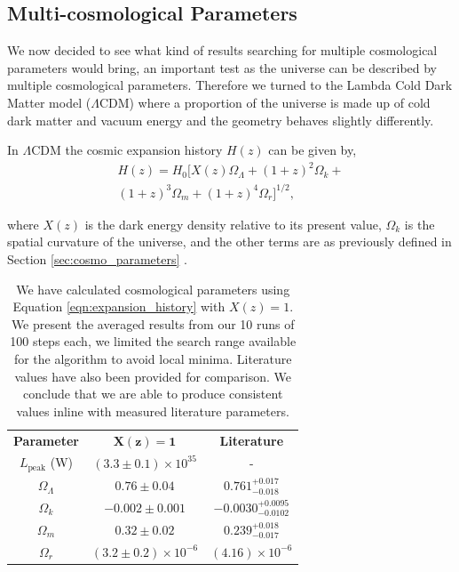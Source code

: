 \documentclass[twocolumn]{revtex4}
\begin{document}
{\vspace{-3ex}
\subsection{Multi-cosmological Parameters} 
\vspace{-2ex}
We now decided to see what kind of results searching for multiple cosmological parameters would bring, an important test as the universe can be described by multiple cosmological parameters. Therefore we turned to the Lambda Cold Dark Matter model ($\Lambda$CDM) where a proportion of the universe is made up of cold dark matter and vacuum energy \cite{mod_ast, quintessence} and the geometry behaves slightly differently. 

In $\Lambda$CDM the cosmic expansion history $H(z)$ can be given by, 
\begin{multline}
H(z)=H_0[X(z)\Omega_\Lambda+(1+z)^2\Omega_k+\\
(1+z)^3\Omega_m+(1+z)^4\Omega_r]^{1/2},
\label{eqn:expansion_history}
\end{multline}

where $X(z)$ is the dark energy density relative to its present value, $\Omega_k$ is the spatial curvature of the universe, and the other terms are as previously defined in Section \ref{sec:cosmo_parameters} \cite{cosmo_constraints}.

{\renewcommand{\arraystretch}{1.2}%
\begin{table}[h!]
\centering
\begin{tabular}{c@{\hskip 15pt}c@{\hskip 15pt}c} 
 \hline
 \textbf{Parameter} & \textbf{$\boldsymbol{X(z)=1}$} & \textbf{Literature} \\ [0.5ex] 
 $L_{\text{peak}}$ (W) & $(3.3\pm0.1)\times 10^{35}$ & - \\
 $\Omega_\Lambda$ & $0.76\pm0.04$ & $0.761^{+0.017}_{-0.018}$ \\
 $\Omega_k$ & $-0.002\pm0.001$ & $-0.0030^{+0.0095}_{-0.0102}$ \\
 $\Omega_m$ & $0.32\pm0.02$ & $0.239^{+0.018}_{-0.017}$ \\
 $\Omega_r$ & $(3.2\pm0.2)\times10^{-6}$ & $(4.16)\times10^{-6}$ \\
 \hline
\end{tabular}
\caption{We have calculated cosmological parameters using Equation \ref{eqn:expansion_history} with $X(z)=1$. We present the averaged results from our 10 runs of 100 steps each, we limited the search range available for the algorithm to avoid local minima. Literature values have also been provided for comparison. We conclude that we are able to produce consistent values inline with measured literature parameters.}
\vspace{-0.5em}
\label{table:extended_search}
\end{table}

}}
\end{document}
